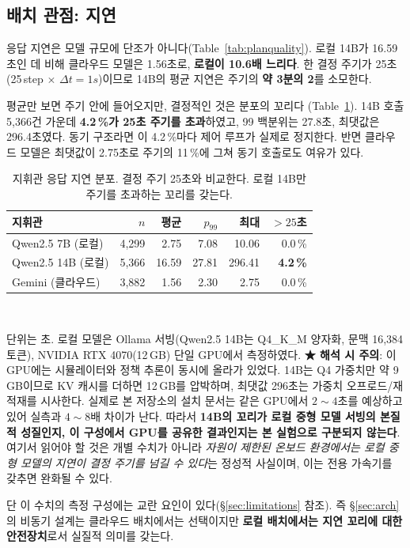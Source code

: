 \subsection{배치 관점: 지연}
\label{sec:res_latency}

응답 지연은 모델 규모에 단조가 아니다(Table~\ref{tab:planquality}). 로컬 14B가 16.59초인 데
비해 클라우드 모델은 1.56초로, \textbf{로컬이 10.6배 느리다}. 한 결정 주기가 25초
(25\,step $\times$ $\Delta t\!=\!1\unit{s}$)이므로 14B의 평균 지연은 주기의 \textbf{약
3분의 2}를 소모한다.

평균만 보면 주기 안에 들어오지만, 결정적인 것은 분포의 꼬리다
(Table~\ref{tab:latency_tail}). 14B 호출 5{,}366건 가운데 \textbf{4.2\,\%가 25초 주기를
초과}하였고, 99 백분위는 27.8초, 최댓값은 296.4초였다. 동기 구조라면 이 4.2\,\%마다 제어
루프가 실제로 정지한다. 반면 클라우드 모델은 최댓값이 2.75초로 주기의 11\,\%에 그쳐
동기 호출로도 여유가 있다.

\begin{table}[tp]
\centering
\caption{지휘관 응답 지연 분포. 결정 주기 25초와 비교한다. 로컬 14B만 주기를 초과하는
         꼬리를 갖는다.}
\label{tab:latency_tail}
\footnotesize
\begin{tabular}{lrrrrr}
\toprule
지휘관 & $n$ & 평균 & $p_{99}$ & 최대 & $>25$초 \\
\midrule
Qwen2.5 7B (로컬)    & 4{,}299 & 2.75  & 7.08  & 10.06  & 0.0\,\% \\
Qwen2.5 14B (로컬)   & 5{,}366 & 16.59 & 27.81 & 296.41 & \textbf{4.2\,\%} \\
Gemini (클라우드)    & 3{,}882 & 1.56  & 2.30  & 2.75   & 0.0\,\% \\
\bottomrule
\end{tabular}
\\[3pt]
\begin{minipage}{\linewidth}\footnotesize
단위는 초. 로컬 모델은 Ollama 서빙(Qwen2.5 14B는 Q4\_K\_M 양자화, 문맥 16{,}384 토큰),
NVIDIA RTX 4070(12\,GB) 단일 GPU에서 측정하였다.
\textbf{★ 해석 시 주의}: 이 GPU에는 시뮬레이터와 정책 추론이 동시에 올라가 있었다.
14B는 Q4 가중치만 약 9\,GB이므로 KV 캐시를 더하면 12\,GB를 압박하며, 최댓값 296초는
가중치 오프로드/재적재를 시사한다. 실제로 본 저장소의 설치 문서는 같은 GPU에서
$2\sim4$초를 예상하고 있어 실측과 $4\sim8$배 차이가 난다. 따라서
\textbf{14B의 꼬리가 로컬 중형 모델 서빙의 본질적 성질인지, 이 구성에서 GPU를 공유한
결과인지는 본 실험으로 구분되지 않는다}. 여기서 읽어야 할 것은 개별 수치가 아니라
\emph{자원이 제한된 온보드 환경에서는 로컬 중형 모델의 지연이 결정 주기를 넘길 수 있다}는
정성적 사실이며, 이는 전용 가속기를 갖추면 완화될 수 있다.
\end{minipage}
\end{table}

단 이 수치의 측정 구성에는 교란 요인이 있다(\S\ref{sec:limitations} 참조). 즉 \S\ref{sec:arch}의 비동기 설계는 클라우드 배치에서는 선택이지만 \textbf{로컬 배치에서는
지연 꼬리에 대한 안전장치}로서 실질적 의미를 갖는다.
